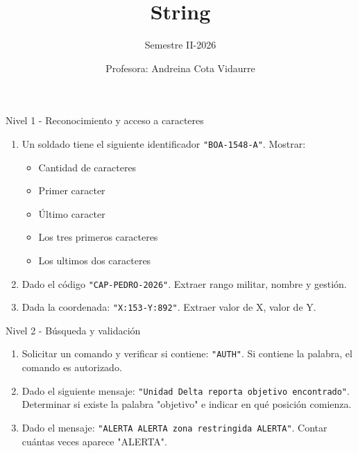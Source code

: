 \documentclass{beamer}
\title{String} %
\subtitle{Semestre II-2026} %
\author{Profesora: Andreina Cota Vidaurre}
\begin{document}
  \shorthandoff{-}
  \frame[c]{\maketitle}


    \begin{frame}[fragile, t]{Nivel 1 -  Reconocimiento y acceso a caracteres}
        \begin{enumerate}
            \item Un soldado tiene el siguiente identificador \texttt{"BOA-1548-A"}. Mostrar:
            \begin{itemize}
                \item Cantidad de caracteres
                \item Primer caracter
                \item Último caracter
                \item Los tres primeros caracteres
                \item Los ultimos dos caracteres
            \end{itemize}
            \item Dado el código \texttt{"CAP-PEDRO-2026"}. Extraer rango militar, nombre y gestión.
            \item Dada la coordenada: \texttt{"X:153-Y:892"}. Extraer valor de X, valor de Y.
        \end{enumerate}
    \end{frame}

    \begin{frame}[fragile, t]{Nivel 2 -  Búsqueda y validación}
        \begin{enumerate}
            \item Solicitar un comando y verificar si contiene: \texttt{"AUTH"}. Si contiene la palabra, el comando es autorizado.
            \item Dado el siguiente mensaje: \texttt{"Unidad Delta reporta objetivo encontrado"}. Determinar si existe la palabra "objetivo" e indicar en qué posición comienza.
            \item Dado el mensaje: \texttt{"ALERTA ALERTA zona restringida ALERTA"}. Contar cuántas veces aparece "ALERTA".
        \end{enumerate}
    \end{frame}
\end{document}
